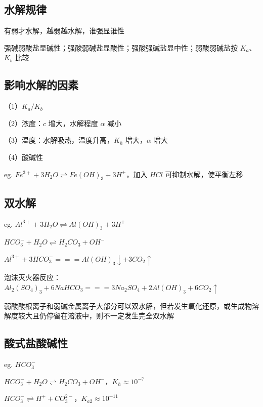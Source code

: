 \documentclass[UTF8,zihao=-4,openany]{ctexbook}
\begin{document}
\subsection{水解规律}
有弱才水解，越弱越水解，谁强显谁性\par

强碱弱酸盐显碱性；强酸弱碱盐显酸性；强酸强碱盐显中性；弱酸弱碱盐按 $K_a$、$K_b$ 比较\par
\subsection{影响水解的因素}
（1）$K_a/K_b$\par

（2）浓度：$c$ 增大，水解程度 $\alpha$ 减小\par

（3）温度：水解吸热，温度升高，$K_h$ 增大，$\alpha$ 增大\par

（4）酸碱性\par

eg. $Fe^{3+}+3H_2O\rightleftharpoons Fe(OH)_3+3H^+$，加入 $HCl$ 可抑制水解，使平衡左移\par
\subsection{双水解}
eg. $Al^{3+}+3H_2O\rightleftharpoons Al(OH)_3+3H^+$\par

$HCO_3^-+H_2O\rightleftharpoons H_2CO_3+OH^-$\par

$Al^{3+}+3HCO_3^-=\!=\!=Al(OH)_3\downarrow+3CO_2\uparrow$\par

泡沫灭火器反应：$Al_2(SO_4)_3+6NaHCO_3=\!=\!=3Na_2SO_4+2Al(OH)_3+6CO_2\uparrow$\par

弱酸酸根离子和弱碱金属离子大部分可以双水解，但若发生氧化还原，或生成物溶解度较大且仍停留在溶液中，则不一定发生完全双水解\par
\subsection{酸式盐酸碱性}
eg. $HCO_3^-$\par

$HCO_3^-+H_2O\rightleftharpoons H_2CO_3+OH^-$，$K_h\approx10^{-7}$\par

$HCO_3^-\rightleftharpoons H^++CO_3^{2-}$，$K_{a2}\approx10^{-11}$\par
\end{document}

